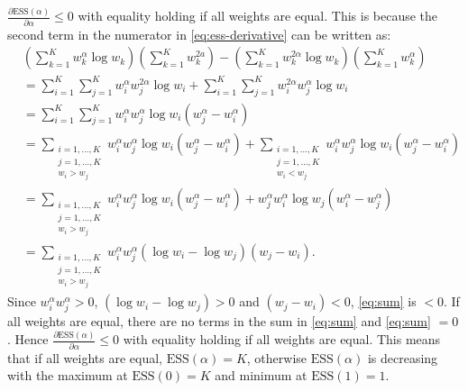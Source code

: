 \documentclass[a4paper]{article}
\DeclareMathOperator{\1}{{}\mathds{1}}
\begin{document}
$\frac{\partial \mathrm{ESS}(\alpha)}{\partial \alpha} \leq 0$ with equality holding if all weights are equal. 
This is because the second term in the numerator in \eqref{eq:ess-derivative} can be written as:
\begin{align}
    &\left(\sum_{k = 1}^K w_k^\alpha \log w_k \right) \left(\sum_{k = 1}^K w_k^{2a   } \right) - \left(\sum_{k = 1}^K w_k^{2 \alpha} \log w_k\right) \left(\sum_{k = 1}^K w_k^\alpha \right) \nonumber
    \\&= \sum_{i = 1}^K \sum_{j = 1}^K w_i^\alpha w_j^{2 \alpha} \log w_i + \sum_{i = 1}^K \sum_{j = 1}^K w_i^{2 \alpha} w_j^\alpha \log w_i \\
    &= \sum_{i = 1}^K \sum_{j = 1}^K w_i^\alpha w_j^\alpha \log w_i (w_j^\alpha - w_i^\alpha) \\
    &= \sum_{\substack{i = 1, \dotsc, K \\ j = 1, \dotsc, K \\ w_i > w_j}} w_i^\alpha w_j^\alpha \log w_i (w_j^\alpha - w_i^\alpha) + \sum_{\substack{i = 1, \dotsc, K \\ j = 1, \dotsc, K \\ w_i < w_j}} w_i^\alpha w_j^\alpha \log w_i (w_j^\alpha - w_i^\alpha) \\
    &= \sum_{\substack{i = 1, \dotsc, K \\ j = 1, \dotsc, K \\ w_i > w_j}} w_i^\alpha w_j^\alpha \log w_i (w_j^\alpha - w_i^\alpha) + w_j^\alpha w_i^\alpha \log w_j (w_i^\alpha - w_j^\alpha) \\
    &= \sum_{\substack{i = 1, \dotsc, K \\ j = 1, \dotsc, K \\ w_i > w_j}} w_i^\alpha w_j^\alpha (\log w_i - \log w_j) (w_j - w_i). \label{eq:sum}
\end{align}
Since $w_i^\alpha w_j^\alpha > 0$, $(\log w_i - \log w_j) > 0$ and $(w_j - w_i) < 0$, \eqref{eq:sum} is $< 0$.
If all weights are equal, there are no terms in the sum in \eqref{eq:sum} and \eqref{eq:sum} $= 0$.
Hence $\frac{\partial \mathrm{ESS}(\alpha)}{\partial \alpha} \leq 0$ with equality holding if all weights are equal.
This means that if all weights are equal, $\mathrm{ESS}(\alpha) = K$, otherwise $\mathrm{ESS}(\alpha)$ is decreasing with the maximum at $\mathrm{ESS}(0) = K$ and minimum at $\mathrm{ESS}(1) = 1$.
\end{document}

